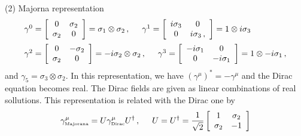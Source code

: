 \noindent
(2) Majorna representation\\
\begin{eqnarray}
\begin{array}{l}
\gamma^0
=
\left[
\begin{array}{cc}
0 & \sigma_2 \\ \sigma_2 & 0
\end{array}
\right]
= \sigma_1 \otimes \sigma_2
\,,
\hspace{5mm}
\gamma^1
=
\left[
\begin{array}{cc}
i\sigma_3 & 0 \\  0 & i\sigma_3\,,
\end{array}
\right]
=
1 \otimes i\sigma_3
\vspace{2mm}
\\ %
\gamma^2
=
\left[
\begin{array}{cc}
0 & -\sigma_2 \\ \sigma_2 & 0
\end{array}
\right]
= -i\sigma_2 \otimes \sigma_2
\,,
\hspace{5mm}
\gamma^3
=
\left[
\begin{array}{cc}
-i\sigma_1 & 0 \\  0 & -i\sigma_1
\end{array}
\right]
=
1 \otimes -i\sigma_1\,,
\end{array}
\end{eqnarray}
and $\gamma_5 = \sigma_3 \otimes \sigma_2$.
In this representation, we have $(\gamma^\mu)^* = - \gamma^\mu$ and
the Dirac equation becomes real. The Dirac fields are given as linear combinations
of real sollutions. This representation is related with the Dirac one by
\begin{eqnarray}
\gamma^\mu_{\mbox{\tiny Majorana}}
= U \gamma^\mu_{\mbox{\tiny Dirac}} U^{\dagger}\,,
\hspace{5mm}
U = U^\dagger =
\frac{1}{\sqrt{2}}
\left[
\begin{array}{cc}
1 & \sigma_2 \\
\sigma_2 & -1
\end{array}
\right]
\end{eqnarray}\\

